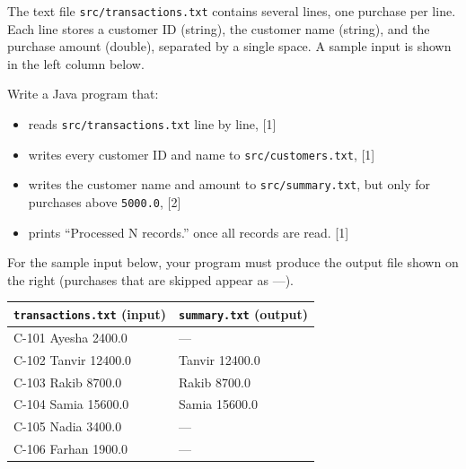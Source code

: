 
\noindent The text file \texttt{src/transactions.txt} contains several lines,
one purchase per line. Each line stores a customer ID (string), the customer
name (string), and the purchase amount (double), separated by a single space.
A sample input is shown in the left column below.

\noindent Write a Java program that:
\begin{itemize}[itemsep=2pt, topsep=4pt]
    \item reads \texttt{src/transactions.txt} line by line, \hfill [1]
    \item writes every customer ID and name to \texttt{src/customers.txt}, \hfill [1]
    \item writes the customer name and amount to \texttt{src/summary.txt},
          but only for purchases above \texttt{5000.0}, \hfill [2]
    \item prints ``Processed N records.'' once all records are read. \hfill [1]
\end{itemize}

\noindent For the sample input below, your program must produce the output
file shown on the right (purchases that are skipped appear as ---).

\vspace{0.3cm}
{\renewcommand{\arraystretch}{1.35}
\begin{tabular}{|>{\raggedright\arraybackslash\ttfamily\small}p{}|>{\raggedright\arraybackslash\ttfamily\small}p{}|}
\hline
\textbf{\texttt{transactions.txt} (input)} & \textbf{\texttt{summary.txt} (output)} \\ \hline
C-101 Ayesha 2400.0  & --- \\ \hline
C-102 Tanvir 12400.0 & Tanvir 12400.0 \\ \hline
C-103 Rakib 8700.0   & Rakib 8700.0 \\ \hline
C-104 Samia 15600.0  & Samia 15600.0 \\ \hline
C-105 Nadia 3400.0   & --- \\ \hline
C-106 Farhan 1900.0  & --- \\ \hline
\end{tabular}}

